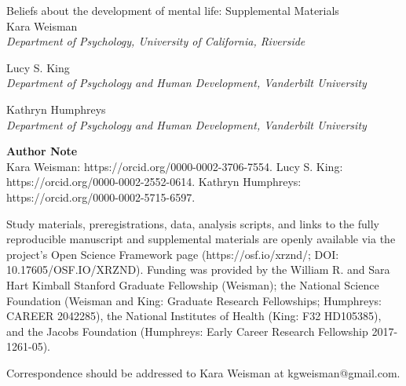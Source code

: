 \begin{titlepage}
    \begin{center}
        \vspace*{1in}
        {\Large Beliefs about the development of mental life: Supplemental Materials} \\[2cm]
        
        Kara Weisman\\
        \textit{Department of Psychology, University of California, Riverside}\par
        \vspace{0.5cm}
        Lucy S. King\\
        \textit{Department of Psychology and Human Development, Vanderbilt University}\par
        \vspace{0.5cm}
        Kathryn Humphreys\\
        \textit{Department of Psychology and Human Development, Vanderbilt University}\par
    
    \end{center}
    \vfill
    \textbf{Author Note} \\
    \setlength{\parindent}{2em}
    \indent Kara Weisman: https://orcid.org/0000-0002-3706-7554. Lucy S. King: https://orcid.org/0000-0002-2552-0614. Kathryn Humphreys: https://orcid.org/0000-0002-5715-6597.

    \indent Study materials, preregistrations, data, analysis scripts, and links to the fully reproducible manuscript and supplemental materials are openly available via the project’s Open Science Framework page (https://osf.io/xrznd/; DOI: 10.17605/OSF.IO/XRZND). Funding was provided by the William R. and Sara Hart Kimball Stanford Graduate Fellowship (Weisman); the National Science Foundation (Weisman and King: Graduate Research Fellowships; Humphreys: CAREER 2042285), the National Institutes of Health (King: F32 HD105385), and the Jacobs Foundation (Humphreys: Early Career Research Fellowship 2017-1261-05).

    \indent Correspondence should be addressed to Kara Weisman at kgweisman@gmail.com.
\end{titlepage}
